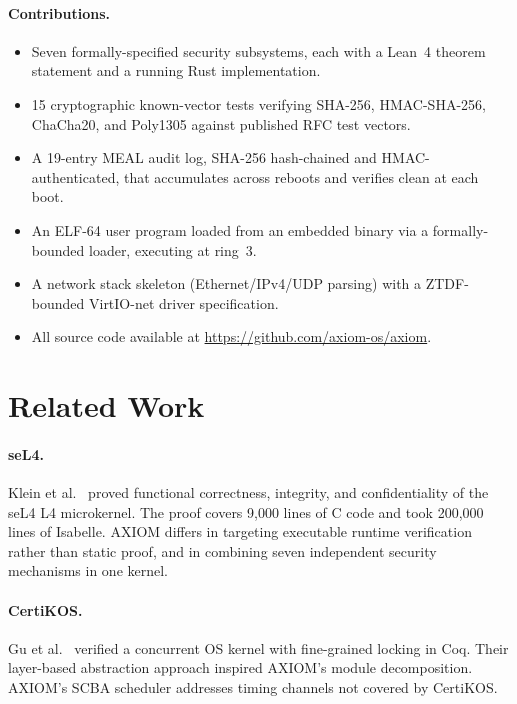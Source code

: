 \documentclass[10pt,twocolumn]{article}
\begin{document}
\paragraph{Contributions.}
\begin{itemize}
  \item Seven formally-specified security subsystems, each with a Lean~4
        theorem statement and a running Rust implementation.
  \item 15 cryptographic known-vector tests verifying SHA-256, HMAC-SHA-256,
        ChaCha20, and Poly1305 against published RFC test vectors.
  \item A 19-entry MEAL audit log, SHA-256 hash-chained and HMAC-authenticated,
        that accumulates across reboots and verifies clean at each boot.
  \item An ELF-64 user program loaded from an embedded binary via a
        formally-bounded loader, executing at ring~3.
  \item A network stack skeleton (Ethernet/IPv4/UDP parsing) with a
        ZTDF-bounded VirtIO-net driver specification.
  \item All source code available at \url{https://github.com/axiom-os/axiom}.
\end{itemize}

\section{Related Work}

\paragraph{seL4.} Klein et al.~\cite{klein2009sel4} proved functional
correctness, integrity, and confidentiality of the seL4 L4 microkernel.
The proof covers 9,000 lines of C code and took 200,000 lines of Isabelle.
AXIOM differs in targeting executable runtime verification rather than
static proof, and in combining seven independent security mechanisms in
one kernel.

\paragraph{CertiKOS.} Gu et al.~\cite{gu2016certikos} verified a concurrent
OS kernel with fine-grained locking in Coq. Their layer-based abstraction
approach inspired AXIOM's module decomposition. AXIOM's SCBA scheduler
addresses timing channels not covered by CertiKOS.
\end{document}
